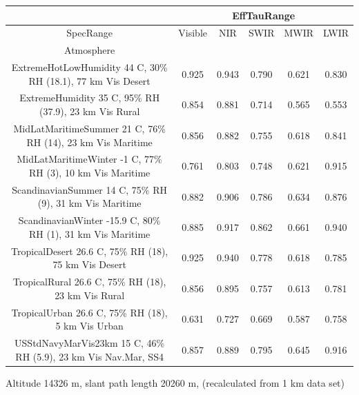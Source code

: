 \documentclass{workpackage}
\begin{document}
\begin{center}

\begin{footnotesize}

\begin{tabular}{|c|c|c|c|c|c|}
\hline
&\multicolumn{5}{|c|}{EffTauRange}\\\hline
SpecRange&Visible&NIR&SWIR&MWIR&LWIR\\\hline
Atmosphere&&&&&\\\hline
ExtremeHotLowHumidity 44 C, 30\% RH (18.1), 77 km Vis Desert&0.925&0.943&0.790&0.621&0.830\\\hline
ExtremeHumidity 35 C, 95\% RH (37.9), 23 km Vis Rural&0.854&0.881&0.714&0.565&0.553\\\hline
MidLatMaritimeSummer 21 C, 76\% RH (14), 23 km Vis Maritime&0.856&0.882&0.755&0.618&0.841\\\hline
MidLatMaritimeWinter -1 C, 77\% RH (3), 10 km Vis Maritime&0.761&0.803&0.748&0.621&0.915\\\hline
ScandinavianSummer 14 C, 75\% RH (9), 31 km Vis Maritime&0.882&0.906&0.786&0.634&0.876\\\hline
ScandinavianWinter -15.9 C, 80\% RH (1), 31 km Vis Maritime&0.885&0.917&0.862&0.661&0.940\\\hline
TropicalDesert 26.6 C, 75\% RH (18), 75 km Vis Desert&0.925&0.940&0.778&0.618&0.785\\\hline
TropicalRural 26.6 C, 75\% RH (18), 23 km Vis Rural&0.856&0.895&0.757&0.613&0.781\\\hline
TropicalUrban 26.6 C, 75\% RH (18), 5 km Vis Urban&0.631&0.727&0.669&0.587&0.758\\\hline
USStdNavyMarVis23km 15 C, 46\% RH (5.9), 23 km Vis Nav.Mar, SS4&0.857&0.889&0.795&0.645&0.916\\\hline

\end{tabular}
\end{footnotesize}
\end{center}



Altitude 14326 m, slant path length 20260 m, (recalculated from 1 km data set)
\end{document}
